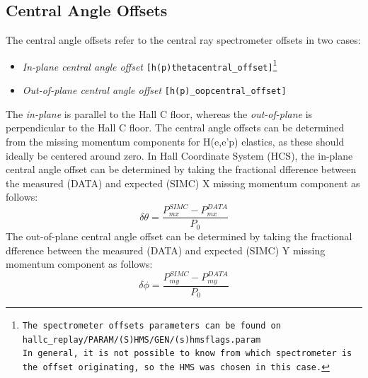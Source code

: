 \documentclass[11pt]{article}
\begin{document}
\subsection{Central Angle Offsets}
\noindent The central angle offsets refer to the central ray spectrometer offsets in two cases:
\begin{itemize}
\item \textit{In-plane central angle offset} \texttt{[h(p)thetacentral\_offset]\footnote{The spectrometer offsets parameters can be found on \texttt{hallc\_replay/PARAM/(S)HMS/GEN/(s)hmsflags.param} \\ In general, it is not possible to know from which spectrometer is the offset originating, so the HMS was chosen in this case.}}
\item \textit{Out-of-plane central angle offset} \texttt{[h(p)\_oopcentral\_offset]}
\end{itemize}
The \textit{in-plane} is parallel to the Hall C floor, whereas the \textit{out-of-plane} is perpendicular to the Hall C floor.
The central angle offsets can be determined from the missing momentum components for H(e,e'p) elastics, as these should ideally
be centered around zero. In Hall Coordinate System (HCS), the in-plane central angle offset can be determined by taking the fractional dfference between
the measured (DATA) and expected (SIMC) X missing momentum component as follows:
\begin{equation}
  \delta \theta = \frac{P_{mx}^{SIMC} - P_{mx}^{DATA}}{P_{0}}
\end{equation}
The out-of-plane central angle offset can be determined by taking the fractional dfference between
the measured (DATA) and expected (SIMC) Y missing momentum component as follows:
\begin{equation}
  \delta \phi = \frac{P_{my}^{SIMC} - P_{my}^{DATA}}{P_{0}}
\end{equation}
\end{document}
